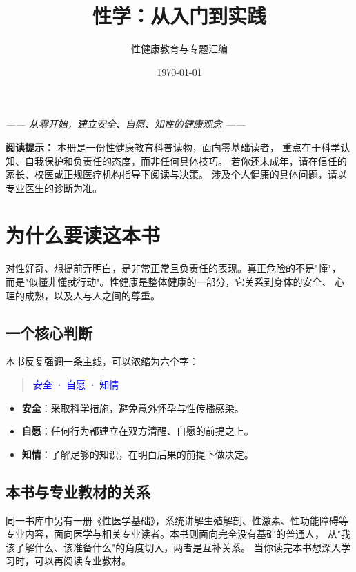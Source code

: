 \documentclass[12pt,UTF8,openany]{ctexbook}
\title{\myhei\zihao{0} 性学：从入门到实践}
\author{性健康教育与专题汇编}
\date{\today}
\newcommand{\myhei}{\CJKfamily{hei}}
\begin{document}
\maketitle

\begin{center}
\itshape{}
—— 从零开始，建立安全、自愿、知性的健康观念 ——
\end{center}

\vspace{1em}

\noindent\textbf{阅读提示：} 本册是一份性健康教育科普读物，面向零基础读者，
重点在于科学认知、自我保护和负责任的态度，而非任何具体技巧。
若你还未成年，请在信任的家长、校医或正规医疗机构指导下阅读与决策。
涉及个人健康的具体问题，请以专业医生的诊断为准。

\tableofcontents

\chapter{为什么要读这本书}

对性好奇、想提前弄明白，是非常正常且负责任的表现。真正危险的不是"懂"，
而是"似懂非懂就行动"。性健康是整体健康的一部分，它关系到身体的安全、
心理的成熟，以及人与人之间的尊重。

\section{一个核心判断}

本书反复强调一条主线，可以浓缩为六个字：

\begin{quote}
\centering \myhei{}\textcolor{blue}{安全 · 自愿 · 知情}
\end{quote}

\begin{itemize}
  \item \textbf{安全}：采取科学措施，避免意外怀孕与性传播感染。
  \item \textbf{自愿}：任何行为都建立在双方清醒、自愿的前提之上。
  \item \textbf{知情}：了解足够的知识，在明白后果的前提下做决定。
\end{itemize}

\section{本书与专业教材的关系}

同一书库中另有一册《性医学基础》，系统讲解生殖解剖、性激素、性功能障碍等
专业内容，面向医学与相关专业读者。本书则面向完全没有基础的普通人，
从"我该了解什么、该准备什么"的角度切入，两者是互补关系。
当你读完本书想深入学习时，可以再阅读专业教材。
\end{document}
